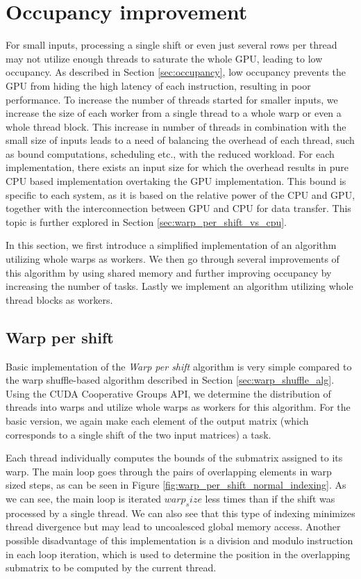 \section{Occupancy improvement}

For small inputs, processing a single shift or even just several rows per thread may not utilize enough threads to saturate the whole GPU, leading to low occupancy. As described in Section \ref{sec:occupancy}, low occupancy prevents the GPU from hiding the high latency of each instruction, resulting in poor performance. To increase the number of threads started for smaller inputs, we increase the size of each worker from a single thread to a whole warp or even a whole thread block. This increase in number of threads in combination with the small size of inputs leads to a need of balancing the overhead of each thread, such as bound computations, scheduling etc., with the reduced workload. For each implementation, there exists an input size for which the overhead results in pure CPU based implementation overtaking the GPU implementation. This bound is specific to each system, as it is based on the relative power of the CPU and GPU, together with the interconnection between GPU and CPU for data transfer. This topic is further explored in Section \ref{sec:warp_per_shift_vs_cpu}.

In this section, we first introduce a simplified implementation of an algorithm utilizing whole warps as workers. We then go through several improvements of this algorithm by using shared memory and further improving occupancy by increasing the number of tasks. Lastly we implement an algorithm utilizing whole thread blocks as workers.

\subsection{Warp per shift}

Basic implementation of the \textit{Warp per shift} algorithm is very simple compared to the warp shuffle-based algorithm described in Section \ref{sec:warp_shuffle_alg}. Using the CUDA Cooperative Groups API, we determine the distribution of threads into warps and utilize whole warps as workers for this algorithm. For the basic version, we again make each element of the output matrix (which corresponds to a single shift of the two input matrices) a task.

Each thread individually computes the bounds of the submatrix assigned to its warp. The main loop goes through the pairs of overlapping elements in warp sized steps, as can be seen in Figure \ref{fig:warp_per_shift_normal_indexing}. As we can see, the main loop is iterated $warp_size$ less times than if the shift was processed by a single thread. We can also see that this type of indexing minimizes thread divergence but may lead to uncoalesced global memory access. Another possible disadvantage of this implementation is a division and modulo instruction in each loop iteration, which is used to determine the position in the overlapping submatrix to be computed by the current thread.

